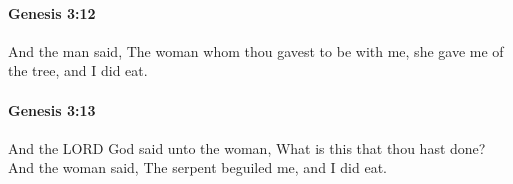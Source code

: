 		\paragraph{Genesis 3:12} %
			\label{GENESIS-3-12}

			And the man said, The woman whom thou gavest to be with me, she gave me of the tree, and I did eat.


		\paragraph{Genesis 3:13} %
			\label{GENESIS-3-13}

			And the LORD God said unto the woman, What is this that thou hast done? And the woman said, The serpent beguiled me, and I did eat.


